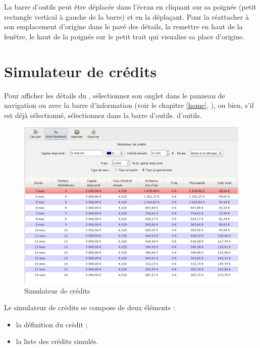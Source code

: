 La barre d'outils peut être déplacée dans l'écran en cliquant sur sa poignée (petit rectangle vertical à gauche de la barre) et en la déplaçant. Pour la réattacher à son emplacement d'origine dans le pavé des détails, la remettre en haut de la fenêtre, le haut de la poignée sur le petit trait qui visualise sa place d'origine.

\ifIllustration
\else
\newpage
\fi


\section{Simulateur de crédits\label{credit-simulation}}


Pour afficher les détails du , sélectionnez son onglet dans le panneau de navigation ou avec la barre d'information (voir le chapitre \vref{home}, ), ou bien, s'il est déjà sélectionné, sélectionnez  dans la barre \ifIllustration d'outils.
\else d'outils.
\fi

\ifIllustration
\begin{figure}[htb]
\begin{center}
\includegraphics[scale=0.5]{image/screenshot/credit_simulation}
\end{center}
\caption{Simulateur de crédits}
\label{credit-simulation-img}
\end{figure}
\fi
 
Le simulateur de crédits se compose de deux éléments :
\begin{itemize}
	 \item la définition du crédit ; 
	 \item la liste des crédits simulés.
\end{itemize}


